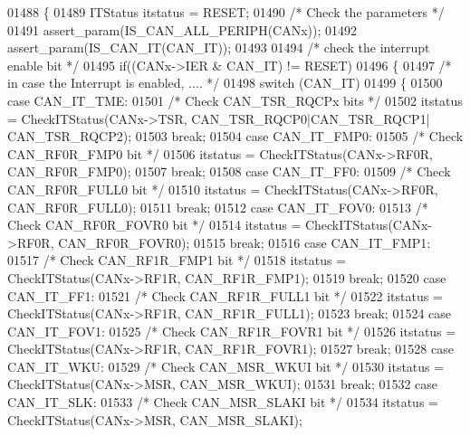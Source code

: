 \begin{DoxyCode}
01488 \{
01489   ITStatus itstatus = RESET;
01490   \textcolor{comment}{/* Check the parameters */}
01491   assert_param(IS_CAN_ALL_PERIPH(CANx));
01492   assert_param(IS_CAN_IT(CAN\_IT));
01493   
01494   \textcolor{comment}{/* check the interrupt enable bit */}
01495  \textcolor{keywordflow}{if}((CANx->IER & CAN\_IT) != RESET)
01496  \{
01497    \textcolor{comment}{/* in case the Interrupt is enabled, .... */}
01498     \textcolor{keywordflow}{switch} (CAN\_IT)
01499     \{
01500       \textcolor{keywordflow}{case} CAN_IT_TME:
01501         \textcolor{comment}{/* Check CAN\_TSR\_RQCPx bits */}
01502         itstatus = CheckITStatus(CANx->TSR, CAN_TSR_RQCP0|CAN_TSR_RQCP1|
      CAN_TSR_RQCP2);  
01503         \textcolor{keywordflow}{break};
01504       \textcolor{keywordflow}{case} CAN_IT_FMP0:
01505         \textcolor{comment}{/* Check CAN\_RF0R\_FMP0 bit */}
01506         itstatus = CheckITStatus(CANx->RF0R, CAN_RF0R_FMP0);  
01507         \textcolor{keywordflow}{break};
01508       \textcolor{keywordflow}{case} CAN_IT_FF0:
01509         \textcolor{comment}{/* Check CAN\_RF0R\_FULL0 bit */}
01510         itstatus = CheckITStatus(CANx->RF0R, CAN_RF0R_FULL0);  
01511         \textcolor{keywordflow}{break};
01512       \textcolor{keywordflow}{case} CAN_IT_FOV0:
01513         \textcolor{comment}{/* Check CAN\_RF0R\_FOVR0 bit */}
01514         itstatus = CheckITStatus(CANx->RF0R, CAN_RF0R_FOVR0);  
01515         \textcolor{keywordflow}{break};
01516       \textcolor{keywordflow}{case} CAN_IT_FMP1:
01517         \textcolor{comment}{/* Check CAN\_RF1R\_FMP1 bit */}
01518         itstatus = CheckITStatus(CANx->RF1R, CAN_RF1R_FMP1);  
01519         \textcolor{keywordflow}{break};
01520       \textcolor{keywordflow}{case} CAN_IT_FF1:
01521         \textcolor{comment}{/* Check CAN\_RF1R\_FULL1 bit */}
01522         itstatus = CheckITStatus(CANx->RF1R, CAN_RF1R_FULL1);  
01523         \textcolor{keywordflow}{break};
01524       \textcolor{keywordflow}{case} CAN_IT_FOV1:
01525         \textcolor{comment}{/* Check CAN\_RF1R\_FOVR1 bit */}
01526         itstatus = CheckITStatus(CANx->RF1R, CAN_RF1R_FOVR1);  
01527         \textcolor{keywordflow}{break};
01528       \textcolor{keywordflow}{case} CAN_IT_WKU:
01529         \textcolor{comment}{/* Check CAN\_MSR\_WKUI bit */}
01530         itstatus = CheckITStatus(CANx->MSR, CAN_MSR_WKUI);  
01531         \textcolor{keywordflow}{break};
01532       \textcolor{keywordflow}{case} CAN_IT_SLK:
01533         \textcolor{comment}{/* Check CAN\_MSR\_SLAKI bit */}
01534         itstatus = CheckITStatus(CANx->MSR, CAN_MSR_SLAKI);  

\end{DoxyCode}
